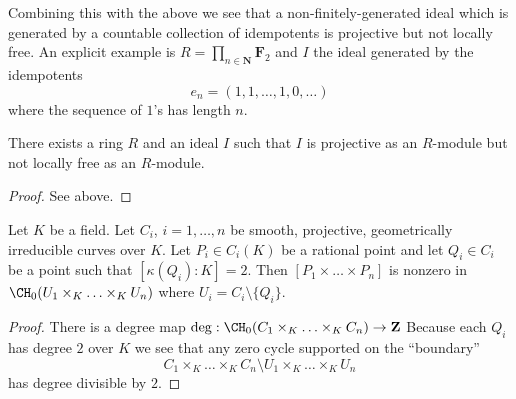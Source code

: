\medskip\noindent
Combining this with the above we see that a non-finitely-generated
ideal which is generated by a countable collection of idempotents
is projective but not locally free. An explicit example is
$R = \prod_{n \in \mathbf{N}} \mathbf{F}_2$ and
$I$ the ideal generated by the idempotents
$$
e_n = (1, 1, \ldots, 1, 0, \ldots )
$$
where the sequence of $1$'s has length $n$.

\begin{lemma}
\label{lemma-ideal-projective-not-locally-free}
There exists a ring $R$ and an ideal $I$ such that $I$ is projective as
an $R$-module but not locally free as an $R$-module.
\end{lemma}

\begin{proof}
See above.
\end{proof}

\begin{lemma}
\label{lemma-chow-group-product}
Let $K$ be a field.
Let $C_i$, $i = 1, \ldots, n$ be smooth, projective, geometrically irreducible
curves over $K$. Let $P_i \in C_i(K)$ be a rational point and
let $Q_i \in C_i$ be a point such that $[\kappa(Q_i) : K] = 2$.
Then $[P_1 \times \ldots \times P_n]$ is nonzero in
$\CH_0(U_1 \times_K \ldots \times_K U_n)$ where $U_i = C_i \setminus \{Q_i\}$.
\end{lemma}

\begin{proof}
There is a degree map
$\deg : \CH_0(C_1 \times_K \ldots \times_K C_n) \to \mathbf{Z}$
Because each $Q_i$ has degree $2$ over $K$ we see that
any zero cycle supported on the ``boundary''
$$
C_1 \times_K \ldots \times_K C_n
\setminus
U_1 \times_K \ldots \times_K U_n
$$
has degree divisible by $2$.
\end{proof}

